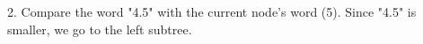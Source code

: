 \documentclass[preview]{standalone}
\begin{document}
2. Compare the word "4.5" with the current node's word (5). Since "4.5" is smaller, we go to the left subtree.\\
\end{document}
